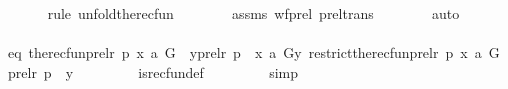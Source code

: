 \begin{isabellebody}
\ \ \ \ \ \ \isamarkupfalse%
{\isacharparenleft}{\kern0pt}rule\ unfold{\isacharunderscore}{\kern0pt}the{\isacharunderscore}{\kern0pt}recfun{\isacharparenright}{\kern0pt}\isanewline
\ \ \ \ \ \ \isamarkupfalse%
\ assms\ wf{\isacharunderscore}{\kern0pt}prel\ prel{\isacharunderscore}{\kern0pt}trans\isanewline
\ \ \ \ \ \ \isamarkupfalse%
\ auto\ \isanewline
\ \ \ \ \isamarkupfalse%
\ \isamarkupfalse%
\ eq{}{\isacharcolon}{\kern0pt}\ {\isachardoublequoteopen}the{\isacharunderscore}{\kern0pt}recfun{\isacharparenleft}{\kern0pt}prel{\isacharparenleft}{\kern0pt}r{\isacharcomma}{\kern0pt}\ p{\isacharparenright}{\kern0pt}{\isacharcomma}{\kern0pt}\ {\isacharless}{\kern0pt}x{\isacharcomma}{\kern0pt}\ a{\isachargreater}{\kern0pt}{\isacharcomma}{\kern0pt}\ G{\isacharparenright}{\kern0pt}\ {\isacharequal}{\kern0pt}\ {\isacharparenleft}{\kern0pt}{\isasymlambda}y{\isasymin}prel{\isacharparenleft}{\kern0pt}r{\isacharcomma}{\kern0pt}\ p{\isacharparenright}{\kern0pt}\ {\isacharminus}{\kern0pt}{\isacharbackquote}{\kern0pt}{\isacharbackquote}{\kern0pt}\ {\isacharbraceleft}{\kern0pt}{\isacharless}{\kern0pt}x{\isacharcomma}{\kern0pt}\ a{\isachargreater}{\kern0pt}{\isacharbraceright}{\kern0pt}{\isachardot}{\kern0pt}\ G{\isacharparenleft}{\kern0pt}y{\isacharcomma}{\kern0pt}\ restrict{\isacharparenleft}{\kern0pt}the{\isacharunderscore}{\kern0pt}recfun{\isacharparenleft}{\kern0pt}prel{\isacharparenleft}{\kern0pt}r{\isacharcomma}{\kern0pt}\ p{\isacharparenright}{\kern0pt}{\isacharcomma}{\kern0pt}\ {\isacharless}{\kern0pt}x{\isacharcomma}{\kern0pt}\ a{\isachargreater}{\kern0pt}{\isacharcomma}{\kern0pt}\ G{\isacharparenright}{\kern0pt}{\isacharcomma}{\kern0pt}\ prel{\isacharparenleft}{\kern0pt}r{\isacharcomma}{\kern0pt}\ p{\isacharparenright}{\kern0pt}\ {\isacharminus}{\kern0pt}{\isacharbackquote}{\kern0pt}{\isacharbackquote}{\kern0pt}\ {\isacharbraceleft}{\kern0pt}y{\isacharbraceright}{\kern0pt}{\isacharparenright}{\kern0pt}{\isacharparenright}{\kern0pt}{\isacharparenright}{\kern0pt}{\isachardoublequoteclose}\ \isanewline
\ \ \ \ \ \ \isamarkupfalse%
\ is{\isacharunderscore}{\kern0pt}recfun{\isacharunderscore}{\kern0pt}def\ \isanewline
\ \ \ \ \ \ \isamarkupfalse%
\ simp\isanewline
\isanewline
\ \ \ \ \isamarkupfalse%

\end{isabellebody}
